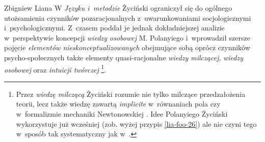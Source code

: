 \begin{artplenv}{Zbigniew Liana}
W \textit{Języku i~metodzie} Życiński ograniczył się do ogólnego utożsamienia czynników pozaracjonalnych z~uwarunkowaniami
socjologicznymi i~psychologicznymi. Z~czasem poddał je jednak dokładniejszej analizie w~perspektywie koncepcji
\textit{wiedzy osobowej} M. Polanyiego i~wprowadził szersze pojęcie \textit{elementów nieskonceptualizowanych} obejmujące
sobą oprócz czynników psycho-społecznych także elementy quasi-racjonalne \textit{wiedzy milczącej}, \textit{wiedzy osobowej}
oraz \textit{intuicji twórczej}
\parencite[zob.][s.~179–191]{zycinski_elementy_1996}\footnote{Przez
\textit{wiedzę milczącą} Życiński rozumie nie tylko milczące przedzałożenia teorii, lecz także wiedzę zawartą
\textit{implicite} w~równaniach pola czy w~formalizmie mechaniki Newtonowskiej
\parencite[zob.][s.~189]{zycinski_elementy_1996}.
Idee Polanyiego Życiński wykorzystuje już wcześniej (zob. wyżej przypis \ref{lia-foo-26}) ale nie czyni
tego w~sposób tak systematyczny jak w~\parencite*{zycinski_elementy_1996}.}.


\end{artplenv}
